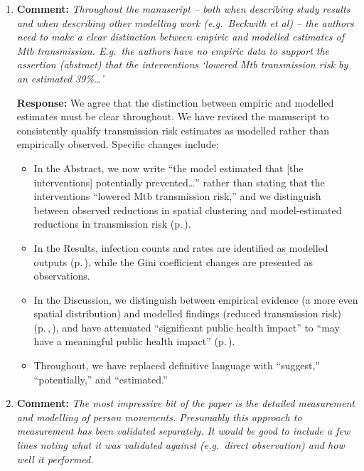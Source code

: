 \documentclass[11pt]{article}
\newcommand{\comment}[1]{\textbf{Comment:} \textit{#1}}
\newcommand{\response}[1]{\textbf{Response:} #1}
\begin{document}
\begin{enumerate}[label=\textbf{R2.\arabic*.}, leftmargin=*]

\item\label{r:2.1} \comment{Throughout the manuscript -- both when describing study results and when describing other modelling work (e.g.\ Beckwith et al) -- the authors need to make a clear distinction between empiric and modelled estimates of Mtb transmission. E.g.\ the authors have no empiric data to support the assertion (abstract) that the interventions `lowered Mtb transmission risk by an estimated 39\%\dots'}

\response{We agree that the distinction between empiric and modelled estimates must be clear throughout. We have revised the manuscript to consistently qualify transmission risk estimates as modelled rather than empirically observed. Specific changes include:

\begin{itemize}
\item In the Abstract, we now write ``the model estimated that [the interventions] potentially prevented\ldots'' rather than stating that the interventions ``lowered Mtb transmission risk,'' and we distinguish between observed reductions in spatial clustering and model-estimated reductions in transmission risk (p.\,\pageref{chg:R2.1abs2}).
\item In the Results, infection counts and rates are identified as modelled outputs (p.\,\pageref{chg:R2.1results}), while the Gini coefficient changes are presented as observations.
\item In the Discussion, we distinguish between empirical evidence (a more even spatial distribution) and modelled findings (reduced transmission risk) (p.\,\pageref{chg:R2.1disc2},\,\pageref{chg:R2.1disc3}), and have attenuated ``significant public health impact'' to ``may have a meaningful public health impact'' (p.\,\pageref{chg:R2.1disc4}). \item Throughout, we have replaced definitive language with ``suggest,'' ``potentially,'' and ``estimated.''
\end{itemize}}

\item\label{r:2.2} \comment{The most impressive bit of the paper is the detailed measurement and modelling of person movements. Presumably this approach to measurement has been validated separately. It would be good to include a few lines noting what it was validated against (e.g.\ direct observation) and how well it performed.}


\end{enumerate}
\end{document}
